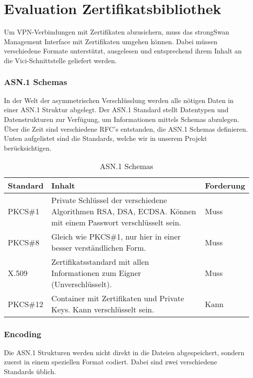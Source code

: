 \section{Evaluation Zertifikatsbibliothek}
Um VPN-Verbindungen mit Zertifikaten abzusichern, muss das strongSwan Management Interface mit Zertifikaten umgehen können. Dabei müssen verschiedene Formate unterstützt, ausgelesen und entsprechend ihrem Inhalt an die Vici-Schnittstelle geliefert werden.
\subsubsection{ASN.1 Schemas}
In der Welt der asymmetrischen Verschlüsslung werden alle nötigen Daten in einer ASN.1 Struktur abgelegt. Der ASN.1 Standard stellt Datentypen und Datenstrukturen zur Verfügung, um Informationen mittels Schemas abzulegen. Über die Zeit sind verschiedene RFC’s entstanden, die ASN.1 Schemas definieren. Unten aufgelistet sind die Standards, welche wir in unserem Projekt berücksichtigen. \\

\begin{table}[H]
\centering
    \begin{tabular}{|l|p{12cm}|l|}
    \hline
    \rowcolor{lightblue}
    Standard & Inhalt & Forderung   \\ \hline
	PKCS\#1	&	Private Schlüssel der verschiedene Algorithmen RSA, DSA, ECDSA. Können mit einem Passwort verschlüsselt sein.	& Muss \\ \hline	
		PKCS\#8	&	Gleich wie PKCS\#1, nur hier in einer besser verständlichen Form.	& Muss \\ \hline	
		X.509	&	Zertifikatsstandard mit allen Informationen zum Eigner (Unverschlüsselt).	& Muss \\ \hline
		PKCS\#12	&	Container mit Zertifikaten und Private Keys. Kann verschlüsselt sein.	& Kann \\ \hline		
	\end{tabular}
    \caption[ASN.1 Schemas]{ASN.1 Schemas}
\end{table}

\subsubsection{Encoding}
Die ASN.1 Strukturen werden nicht direkt in die Dateien abgespeichert, sondern zuerst in einem speziellen Format codiert. Dabei sind zwei verschiedene Standards üblich.\\

